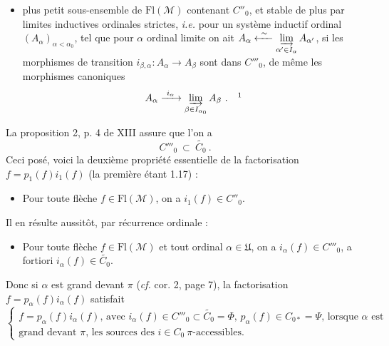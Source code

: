 \documentclass[11pt]{article}
\newcommand{\printedpage}[1]{\marginpar{\footnotesize p.~#1}}
\newcommand{\msp}[1]{\marginpar{\footnotesize [#1]}}
\newcommand{\Fl}{\mathrm{Fl}}
\newcommand{\cM}{\mathcal{M}}
\newcommand{\fU}{\mathfrak{U}}
\begin{document}
\setcounter{footnote}{1}%
\begin{itemize}[leftmargin=10em, labelwidth=9em, labelsep=1em, align=left]
\item[(1.19)\hfill $C'''_0 \ = $] plus petit sous-ensemble de $\Fl(\cM)$ contenant $C''_0$, et stable de plus par limites inductives ordinales strictes, \textit{i.e.} pour un système inductif ordinal $(A_\alpha)_{\alpha<\alpha_0}$, tel que pour $\alpha$ ordinal limite on ait $A_\alpha \xleftarrow{\ \sim\ } \varinjlim\limits_{\alpha' \in I_\alpha} A_{\alpha'}$, si les morphismes de transition $i_{\beta,\alpha} : A_\alpha \longrightarrow A_\beta$ sont dans $C'''_0$, de même les morphismes canoniques
\[
A_\alpha \xrightarrow{\ i_\alpha\ } \varinjlim_{\beta \in I_{\alpha_0}} A_\beta \ . \quad \footnotemark
\]
\end{itemize}

\printedpage{8}
\msp{page 9}

La proposition 2, p. 4 de XIII assure que l'on a
\[
C'''_0 \ \subset \ \widetilde{C_0} \ .
\]
Ceci posé, voici la deuxième propriété essentielle de la factorisation $f = p_1(f)i_1(f)$ (la première étant 1.17) :

\begin{itemize}[leftmargin=5em, labelwidth=4em, labelsep=1em, align=left]
\item[(1.20)] \qquad\qquad Pour toute flèche $f \in \Fl(\cM)$, on a $i_1(f) \in C''_0$.
\end{itemize}

Il en résulte aussitôt, par récurrence ordinale :

\begin{itemize}[leftmargin=5em, labelwidth=4em, labelsep=1em, align=left]
\item[(1.21)] \qquad Pour toute flèche $f \in \Fl(\cM)$ et tout ordinal $\alpha \in \fU$, on a $i_\alpha(f) \in C'''_0$, a fortiori $i_\alpha(f) \in \widetilde{C_0}$.
\end{itemize}

Donc si $\alpha$ est grand devant $\pi$ (\textit{cf.} cor. 2, page 7), la factorisation $f = p_\alpha(f)i_\alpha(f)$ satisfait
\[
\left\{
\begin{array}{l}
f = p_\alpha(f)i_\alpha(f)\text{, avec } i_\alpha(f) \in C'''_0 \subset \widetilde{C_0} = \Phi \text{, } p_\alpha(f) \in C_{0*} = \Psi \text{, lorsque } \alpha \text{ est}\\
\text{grand devant } \pi\text{, les sources des } i \in C_0 \ \pi\text{-accessibles.}
\end{array}
\right.
\tag*{(1.22)}
\]
\end{document}
